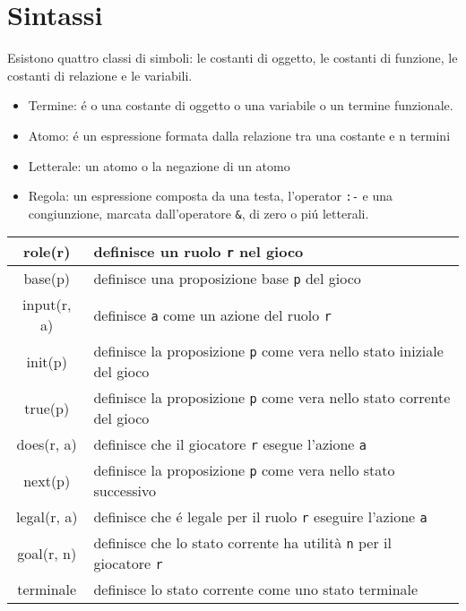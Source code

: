 \section{Sintassi}
Esistono quattro classi di simboli: le costanti di oggetto, 
le costanti di funzione, le costanti di relazione e le variabili. \\
\begin{itemize}
    \item Termine: é o una costante di oggetto o una variabile o un termine funzionale.
    \item Atomo: é un espressione formata dalla relazione tra una costante e n termini
    \item Letterale: un atomo o la negazione di un atomo
    \item {
        Regola: un espressione composta da una testa, l'operator \lstinline|:-| e una congiunzione, 
        marcata dall'operatore \lstinline|&|, di zero o piú letterali.
    }
\end{itemize}
\begin{center}
\begin{tabular}{|c|p{10cm}|}
    \hline
    role(r) & definisce un ruolo \lstinline|r| nel gioco \\
    \hline
    base(p) & definisce una proposizione base \lstinline|p| del gioco \\
    \hline
    input(r, a) & definisce \lstinline|a| come un azione del ruolo \lstinline|r| \\
    \hline
    init(p) & definisce la proposizione \lstinline|p| come vera nello stato iniziale del gioco \\ 
    \hline
    true(p) & definisce la proposizione \lstinline|p| come vera nello stato corrente del gioco \\
    \hline
    does(r, a) & definisce che il giocatore \lstinline|r| esegue l'azione \lstinline|a| \\
    \hline
    next(p) & definisce la proposizione \lstinline|p| come vera nello stato successivo \\
    \hline
    legal(r, a) & definisce che é legale per il ruolo \lstinline|r| eseguire l'azione \lstinline|a| \\
    \hline
    goal(r, n) & definisce che lo stato corrente ha utilità \lstinline|n| per il giocatore \lstinline|r| \\
    \hline
    terminale & definisce lo stato corrente come uno stato terminale \\ 
    \hline
\end{tabular}
\end{center}
